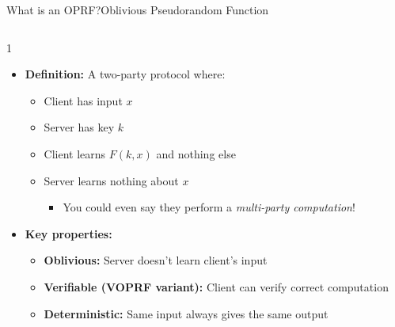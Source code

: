 \ifdefined\PRESENTATION\else\PassOptionsToClass{handout}{beamer}\fi\documentclass[aspectratio=169, lualatex]{beamer}
\begin{document}
\begin{frame}{What is an OPRF?}{Oblivious Pseudorandom Function}
	\begin{columns}[c]
		\begin{column}{1\textwidth}
			\begin{itemize}
				\item \textbf{Definition:} A two-party protocol where:
				      \begin{itemize}
					      \item Client has input $x$
					      \item Server has key $k$
					      \item Client learns $F(k, x)$ and nothing else
					      \item Server learns nothing about $x$
					            \begin{itemize}
						            \item You could even say they perform a \textit{multi-party computation}!
					            \end{itemize}
				      \end{itemize}
				\item \textbf{Key properties:}
				      \begin{itemize}
					      \item \textbf{Oblivious:} Server doesn't learn client's input
					      \item \textbf{Verifiable (VOPRF variant):} Client can verify correct computation
					      \item \textbf{Deterministic:} Same input always gives the same output
				      \end{itemize}
			\end{itemize}
		\end{column}
	\end{columns}
\end{frame}
\end{document}
